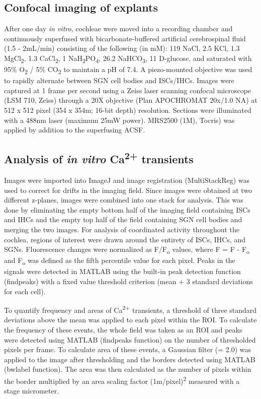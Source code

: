 \documentclass[9pt,lineno]{elife}
\begin{document}
\subsection{Confocal imaging of explants}
After one day \textit{in vitro}, cochleae were moved into a recording chamber and continuously superfused with bicarbonate-buffered artificial cerebrospinal fluid (1.5 - 2mL/min) consisting of the following (in mM): 119 NaCl, 2.5 KCl, 1.3 MgCl\textsubscript{2}, 1.3 CaCl\textsubscript{2}, 1 NaH\textsubscript{2}PO\textsubscript{4}, 26.2 NaHCO\textsubscript{3}, 11 D-glucose, and saturated with 95\% O\textsubscript{2} / 5\% CO\textsubscript{2} to maintain a pH of 7.4. A piezo-mounted objective was used to rapidly alternate between SGN cell bodies and ISCs/IHCs. Images were captured at 1 frame per second using a Zeiss laser scanning confocal microscope (LSM 710, Zeiss) through a 20X objective (Plan APOCHROMAT 20x/1.0 NA) at 512 x 512 pixel (354 x 354\textmu m; 16-bit depth) resolution. Sections were illuminated with a 488nm laser (maximum 25mW power). MRS2500 (1\textmu M), Tocris) was applied by addition to the superfusing ACSF.

\subsection{Analysis of \textit{in vitro} Ca\textsuperscript{2+} transients}
Images were imported into ImageJ and image registration (MultiStackReg) was used to correct for drifts in the imaging field. Since images were obtained at two different z-planes, images were combined into one stack for analysis. This was done by eliminating the empty bottom half of the imaging field containing ISCs and IHCs and the empty top half of the field containing SGN cell bodies and merging the two images. For analysis of coordinated activity throughout the cochlea, regions of interest were drawn around the entirety of ISCs, IHCs, and SGNs. Fluorescence changes were normalized as \textDelta F/F\textsubscript{o} values, where \textDelta F = F - F\textsubscript{o} and F\textsubscript{o} was defined as the fifth percentile value for each pixel. Peaks in the signals were detected in MATLAB using the built-in peak detection function (findpeaks) with a fixed value threshold criterion (mean + 3 standard deviations for each cell).

To quantify frequency and areas of Ca\textsuperscript{2+} transients, a threshold of three standard deviations above the mean was applied to each pixel within the ROI. To calculate the frequency of these events, the whole field was taken as an ROI and peaks were detected using MATLAB (findpeaks function) on the number of thresholded pixels per frame. To calculate area of these events, a Gaussian filter (\textsigma = 2.0) was applied to the image after thresholding and the borders detected using MATLAB (bwlabel function). The area was then calculated as the number of pixels within the border multiplied by an area scaling factor (1\textmu m/pixel)\textsuperscript{2} measured with a stage micrometer. 
\end{document}
